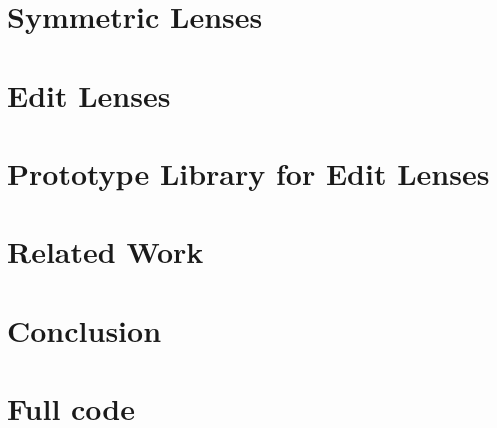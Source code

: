 \documentclass[12pt]{report}
\numberwithin{equation}{section}
\begin{document}
\chapter{Symmetric Lenses}
\label{chap:complement}
\label{chap:symmetric}
\label{chap:symmetry}
\label{chap:symm}



\chapter{Edit Lenses}
\label{chap:delta}
\label{chap:edits}
\label{chap:edit}

\mlinjargs\mlinjnoargs

%
%
%
%
%

\ifimpl
\chapter{Prototype Library for Edit Lenses}
\label{chap:implementation}
\label{chap:impl}


\fi%

\chapter{Related Work}
\label{chap:related}



\chapter{Conclusion}
\label{chap:conclusion}
\label{chap:conc}



\appendix
\chapter{Full code}
\label{app:code}
\label{app:source}
\label{chap:code}
\label{chap:source}
\footnotesize

\normalsize



\end{document}
